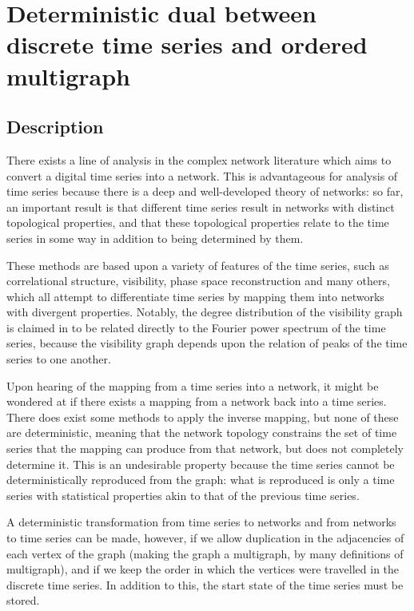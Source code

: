 \documentclass[12pt]{article}
\begin{document}
\section{Deterministic dual between discrete time series and ordered multigraph}

\subsection{Description}

There exists a line of analysis in the complex network literature which aims to convert a digital time series into a network. This is advantageous for analysis of time series because there is a deep and well-developed theory of networks: so far, an important result is that different time series result in networks with distinct topological properties, and that these topological properties relate to the time series in some way in addition to being determined by them\cite{campanharo}.

These methods are based upon a variety of features of the time series, such as correlational structure\cite{correlationgraph}, visibility\cite{lacasa}, phase space reconstruction\cite{phasespacegraph} and many others, which all attempt to differentiate time series by mapping them into networks with divergent properties. Notably, the degree distribution of the visibility graph is claimed in \cite{lacasa} to be related directly to the Fourier power spectrum of the time series, because the visibility graph depends upon the relation of peaks of the time series to one another.

Upon hearing of the mapping from a time series into a network, it might be wondered at if there exists a mapping from a network back into a time series. There does exist some methods to apply the inverse mapping, but none of these are deterministic, meaning that the network topology constrains the set of time series that the mapping can produce from that network, but does not completely determine it\cite{campanharo}. This is an undesirable property because the time series cannot be deterministically reproduced from the graph: what is reproduced is only a time series with statistical properties akin to that of the previous time series.

A deterministic transformation from time series to networks and from networks to time series can be made, however, if we allow duplication in the adjacencies of each vertex of the graph (making the graph a multigraph, by many definitions of multigraph\cite{multigraph}), and if we keep the order in which the vertices were travelled in the discrete time series. In addition to this, the start state of the time series must be stored.
\end{document}
